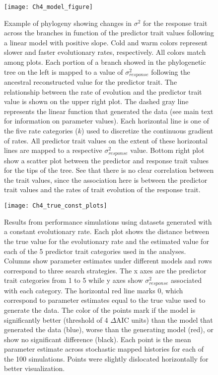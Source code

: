 \begin{figure}[hp]
	\centering
	\texttt{[image: Ch4\_model\_figure]}
	\caption[Example of phylogeny showing changes in $\sigma^{2}$ for the response trait across the branches in function of the predictor trait values following a linear model with positive slope.]{Example of phylogeny showing changes in $\sigma^{2}$ for the response trait across the branches in function of the predictor trait values following a linear model with positive slope. Cold and warm colors represent slower and faster evolutionary rates, respectively. All colors match among plots. Each portion of a branch showed in the phylogenetic tree on the left is mapped to a value of $\sigma^{2}_{response}$ following the ancestral reconstructed value for the predictor trait. The relationship between the rate of evolution and the predictor trait value is shown on the upper right plot. The dashed gray line represents the linear function that generated the data (see main text for information on parameter values). Each horizontal line is one of the five rate categories ($\mathit{k}$) used to discretize the continuous gradient of rates. All predictor trait values on the extent of these horizontal lines are mapped to a respective $\sigma^{2}_{response}$ value. Bottom right plot show a scatter plot between the predictor and response trait values for the tips of the tree. See that there is no clear correlation between the trait values, since the association here is between the predictor trait values and the rates of trait evolution of the response trait.}
	\label{fig:model_example}
\end{figure}

\begin{figure}[hp]
	\centering
	\texttt{[image: Ch4\_true\_const\_plots]}
	\caption[Results from performance simulations using datasets generated with a constant evolutionary rate.]{Results from performance simulations using datasets generated with a constant evolutionary rate. Each plot shows the distance between the true value for the evolutionary rate and the estimated value for each of the 5 predictor trait categories used in the analyses. Columns show parameter estimates under different models and rows correspond to three search strategies. The x axes are the predictor trait categories from 1 to 5 while y axes show $\sigma^{2}_{response}$ associated with each category. The horizontal red line marks 0, which correspond to parameter estimates equal to the true value used to generate the data. The color of the points mark if the model is significantly better (threshold of 4 $\Delta$AIC units) than the model that generated the data (blue), worse than the generating model (red), or show no significant difference (black). Each point is the mean parameter estimate across stochastic mapped histories for each of the 100 simulations. Points were slightly dislocated horizontally for better visualization.}
	\label{fig:chart_const}
\end{figure}

